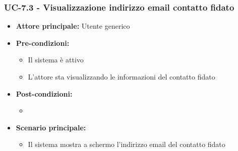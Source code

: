 \documentclass[a4paper,12pt]{article}
\begin{document}
\subsubsection{UC-7.3 - Visualizzazione indirizzo email contatto fidato} \label{subsec:UC-7.3}
\begin{itemize}
    \item \textbf{Attore principale:} Utente generico
    \item \textbf{Pre-condizioni:} 
    \begin{itemize}
        \item Il sistema è attivo
        \item L'attore sta visualizzando le informazioni del contatto fidato
    \end{itemize}
    \item \textbf{Post-condizioni:}
    \begin{itemize}
        \item 
    \end{itemize}
    \item \textbf{Scenario principale:} 
    \begin{itemize}
        \item Il sistema mostra a schermo l'indirizzo email del contatto fidato
    \end{itemize}
\end{itemize}

\end{document}
